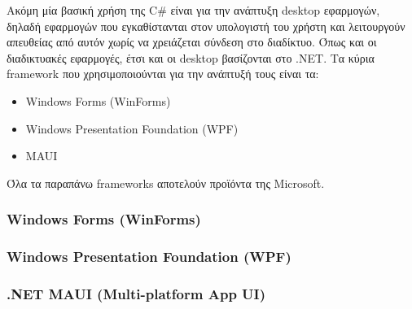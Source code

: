 Ακόμη μία βασική χρήση της C\# είναι για την ανάπτυξη desktop εφαρμογών,
δηλαδή εφαρμογών που εγκαθίστανται στον υπολογιστή του χρήστη και λειτουργούν
απευθείας από αυτόν χωρίς να χρειάζεται σύνδεση στο διαδίκτυο. Όπως και οι διαδικτυακές
εφαρμογές, έτσι και οι desktop βασίζονται στο .NET. Τα κύρια framework που χρησιμοποιούνται 
για την ανάπτυξή τους είναι τα:
\begin{itemize}
    \item Windows Forms (WinForms)
    \item Windows Presentation Foundation (WPF)
    \item MAUI
\end{itemize}
Όλα τα παραπάνω frameworks αποτελούν προϊόντα της Microsoft.

\subsubsection*{Windows Forms (WinForms)}


\subsubsection*{Windows Presentation Foundation (WPF)}


\subsubsection*{.ΝΕΤ MAUI (Multi-platform App UI)}
